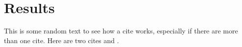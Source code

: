 \section{Results} \label{sec:results}
This is some random text to see how a cite \cite{Barni:2010} works, especially if there are more than one cite. Here are two cites \cite{Barni} and \cite{Bertino:2014}.